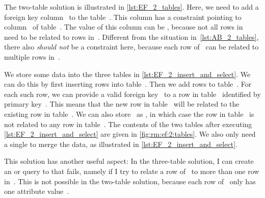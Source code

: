 The two-table solution is illustrated in \cref{lst:EF_2_tables}.
Here, we need to add a foreign key column~ to the table~.
This column has a  constraint pointing to column~ of table~.
The value of this column can be , because not all rows in~ need to be related to rows in~.
Different from the  situation in~\cref{lst:AB_2_tables}, there also \emph{should not} be a  constraint here, because each row of~ can be related to multiple rows in~.

We store some data into the three tables in \cref{lst:EF_2_insert_and_select}.
We can do this by first inserting rows into table~.
Then we add rows to table~.
For each such row, we can provide a valid foreign key~ to a row in table~ identified by primary key~.
This means that the new row in table~ will be related to the existing row in table~.
We can also store~ as , in which case the row in table~ is not related to any row in table~.
The contents of the two tables after executing \cref{lst:EF_2_insert_and_select} are given in \cref{fig:rm:ef:2:tables}.
We also only need a single  to merge the data, as illustrated in \cref{lst:EF_2_insert_and_select}.

This solution has another useful aspect:
In the three-table solution, I can create an  or  query to  that fails, namely if I try to relate a row of~ to more than one row in~.
This is not possible in the two-table solution, because each row of~ only has one attribute value~.%
%
\FloatBarrier%
\endhsection%
%
